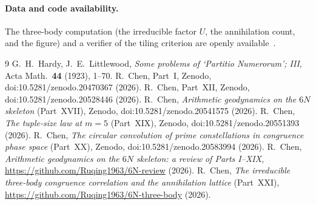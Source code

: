 \documentclass[11pt,a4paper]{article}
\begin{document}
\paragraph{Data and code availability.}
The three-body computation (the irreducible factor $U$, the annihilation count,
and the figure) and a verifier of the tiling criterion are openly
available~\cite{repo}.

\begin{thebibliography}{9}
 G.~H.~Hardy, J.~E.~Littlewood, \emph{Some problems of `Partitio
Numerorum'; III}, Acta Math.\ \textbf{44} (1923), 1--70.
 R.~Chen, Part~I, Zenodo, doi:10.5281/zenodo.20470367 (2026).
 R.~Chen, Part~XII, Zenodo, doi:10.5281/zenodo.20528446 (2026).
 R.~Chen, \emph{Arithmetic geodynamics on the $6N$ skeleton}
(Part~XVII), Zenodo, doi:10.5281/zenodo.20541575 (2026).
 R.~Chen, \emph{The tuple-size law at $m=5$} (Part~XIX), Zenodo,
doi:10.5281/zenodo.20551393 (2026).
 R.~Chen, \emph{The circular convolution of prime constellations
in congruence phase space} (Part~XX), Zenodo, doi:10.5281/zenodo.20583994 (2026).
 R.~Chen, \emph{Arithmetic geodynamics on the $6N$ skeleton: a
review of Parts I--XIX}, \url{https://github.com/Ruqing1963/6N-review} (2026).
 R.~Chen, \emph{The irreducible three-body congruence correlation
and the annihilation lattice} (Part~XXI),
\url{https://github.com/Ruqing1963/6N-three-body} (2026).
\end{thebibliography}
\end{document}
